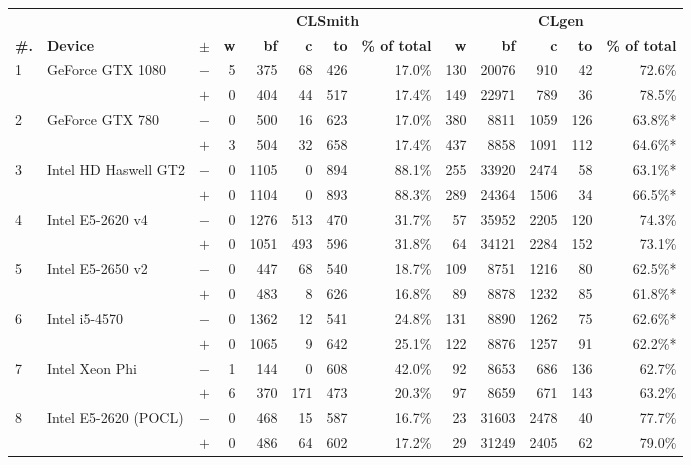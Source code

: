   \begin{tabular}{lll | rrrrr | rrrrr }
  \toprule
  & & & \multicolumn{5}{c|}{\textbf{CLSmith}} & \multicolumn{5}{c}{\textbf{CLgen}} \\
  \textbf{\#.} & \textbf{Device} & $\pm$ &
  \textbf{w} & \textbf{bf} & \textbf{c} & \textbf{to} & \textbf{\% of total} &
  \textbf{w} & \textbf{bf} & \textbf{c} & \textbf{to} & \textbf{\% of total} \\
  \midrule
  \multirow{ 2}{*}{1} & \multirow{ 2}{*}{GeForce GTX 1080} & $-$ & 5 & 375 & 68 & 426 & 17.0\%       & 130 & 20076 & 910 & 42 & 72.6\% \\& & $+$ & 0 & 404 & 44 & 517 & 17.4\% & 149 & 22971 & 789 & 36 & 78.5\% \\
\hline
\multirow{ 2}{*}{2} & \multirow{ 2}{*}{GeForce GTX 780} & $-$ & 0 & 500 & 16 & 623 & 17.0\%       & 380 & 8811 & 1059 & 126 & 63.8\%* \\& & $+$ & 3 & 504 & 32 & 658 & 17.4\% & 437 & 8858 & 1091 & 112 & 64.6\%* \\
\hline
\multirow{ 2}{*}{3} & \multirow{ 2}{*}{Intel HD Haswell GT2} & $-$ & 0 & 1105 & 0 & 894 & 88.1\%       & 255 & 33920 & 2474 & 58 & 63.1\%* \\& & $+$ & 0 & 1104 & 0 & 893 & 88.3\% & 289 & 24364 & 1506 & 34 & 66.5\%* \\
\hline
\multirow{ 2}{*}{4} & \multirow{ 2}{*}{Intel E5-2620 v4} & $-$ & 0 & 1276 & 513 & 470 & 31.7\%       & 57 & 35952 & 2205 & 120 & 74.3\% \\& & $+$ & 0 & 1051 & 493 & 596 & 31.8\% & 64 & 34121 & 2284 & 152 & 73.1\% \\
\hline
\multirow{ 2}{*}{5} & \multirow{ 2}{*}{Intel E5-2650 v2} & $-$ & 0 & 447 & 68 & 540 & 18.7\%       & 109 & 8751 & 1216 & 80 & 62.5\%* \\& & $+$ & 0 & 483 & 8 & 626 & 16.8\% & 89 & 8878 & 1232 & 85 & 61.8\%* \\
\hline
\multirow{ 2}{*}{6} & \multirow{ 2}{*}{Intel i5-4570} & $-$ & 0 & 1362 & 12 & 541 & 24.8\%       & 131 & 8890 & 1262 & 75 & 62.6\%* \\& & $+$ & 0 & 1065 & 9 & 642 & 25.1\% & 122 & 8876 & 1257 & 91 & 62.2\%* \\
\hline
\multirow{ 2}{*}{7} & \multirow{ 2}{*}{Intel Xeon Phi} & $-$ & 1 & 144 & 0 & 608 & 42.0\%       & 92 & 8653 & 686 & 136 & 62.7\% \\& & $+$ & 6 & 370 & 171 & 473 & 20.3\% & 97 & 8659 & 671 & 143 & 63.2\% \\
\hline
\multirow{ 2}{*}{8} & \multirow{ 2}{*}{Intel E5-2620 (POCL)} & $-$ & 0 & 468 & 15 & 587 & 16.7\%       & 23 & 31603 & 2478 & 40 & 77.7\% \\& & $+$ & 0 & 486 & 64 & 602 & 17.2\% & 29 & 31249 & 2405 & 62 & 79.0\% \\

\end{tabular}
